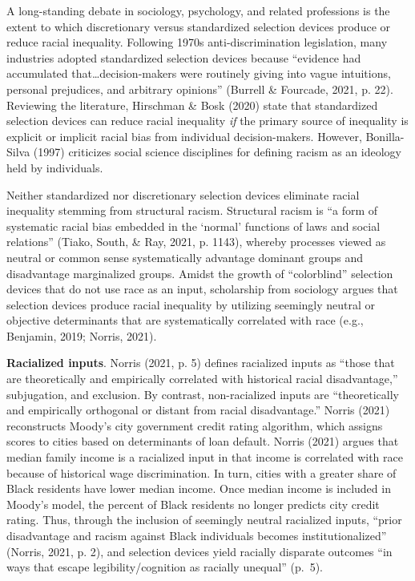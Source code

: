 \documentclass[
  12pt,
]{article}
\begin{document}
A long-standing debate in sociology, psychology, and related professions is the extent to which discretionary versus standardized selection devices produce or reduce racial inequality. Following 1970s anti-discrimination legislation, many industries adopted standardized selection devices because ``evidence had accumulated that\ldots decision-makers were routinely giving into vague intuitions, personal prejudices, and arbitrary opinions'' (Burrell \& Fourcade, 2021, p. 22). Reviewing the literature, Hirschman \& Bosk (2020) state that standardized selection devices can reduce racial inequality \emph{if} the primary source of inequality is explicit or implicit racial bias from individual decision-makers. However, Bonilla-Silva (1997) criticizes social science disciplines for defining racism as an ideology held by individuals.

Neither standardized nor discretionary selection devices eliminate racial inequality stemming from structural racism. Structural racism is ``a form of systematic racial bias embedded in the `normal' functions of laws and social relations'' (Tiako, South, \& Ray, 2021, p. 1143), whereby processes viewed as neutral or common sense systematically advantage dominant groups and disadvantage marginalized groups. Amidst the growth of ``colorblind'' selection devices that do not use race as an input, scholarship from sociology argues that selection devices produce racial inequality by utilizing seemingly neutral or objective determinants that are systematically correlated with race (e.g., Benjamin, 2019; Norris, 2021).

\textbf{Racialized inputs}. Norris (2021, p. 5) defines racialized inputs as ``those that are theoretically and empirically correlated with historical racial disadvantage,'' subjugation, and exclusion. By contrast, non-racialized inputs are ``theoretically and empirically orthogonal or distant from racial disadvantage.'' Norris (2021) reconstructs Moody's city government credit rating algorithm, which assigns scores to cities based on determinants of loan default. Norris (2021) argues that median family income is a racialized input in that income is correlated with race because of historical wage discrimination. In turn, cities with a greater share of Black residents have lower median income. Once median income is included in Moody's model, the percent of Black residents no longer predicts city credit rating. Thus, through the inclusion of seemingly neutral racialized inputs, ``prior disadvantage and racism against Black individuals becomes institutionalized'' (Norris, 2021, p. 2), and selection devices yield racially disparate outcomes ``in ways that escape legibility/cognition as racially unequal'' (p.~5).
\end{document}
